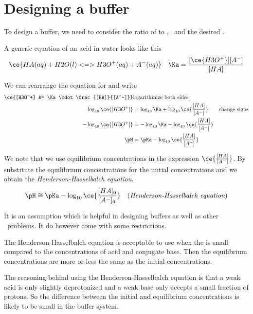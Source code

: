 \documentclass[../mit-general-chemistry.tex]{subfiles}
\begin{document}
\section{Designing a buffer}


To design a buffer, we need to consider the ratio of \ceinl{[HA]} to
\ceinl{[A^-]}, \pKa\ and the desired \pH.

A generic equation of an acid in water looks like this
\begin{align}
  &\ce{HA(aq) + H2O(l) <=> H3O^+(aq) + A^-(aq)}
  &\Ka = \frac{[\ce{H3O^+}][A^-]}{[HA]}
\end{align}

We can rearrange the equation for \Ka and write
\begin{align*}
  \ce{[H3O^+] &= \Ka \cdot\frac{[HA]}{[A^-]}}
  &\text{logarithmize both sides}\\
  \log_{10}\ce{[H3O^+]} &= \log_{10}\Ka +
  \log_{10}\ce{\frac{[HA]}{[A^-]}}
  &\text{change signs}\\
  - \log_{10}\ce{[H3O^+]} &= - \log_{10}\Ka - \log_{10}\ce{\frac{[HA]}{[A^-]}} \\
  \pH &= \pKa - \log_{10}\ce{\frac{[HA]}{[A^-]}} \\
\end{align*}

We note that we use equilibrium concentrations in the expression
$\ce{\frac{[HA]}{[A^-]}}$. By substitute the equilibrium
concentrations for the initial concentrations  and
 we obtain the {\em Henderson-Hasselbalch equation}.
\begin{equation*}
  \pH \cong \pKa - \log_{10}\ce{\frac{[HA]_0}{[A^-]_0}}
  \quad\text{({\em Henderson-Hasselbalch equation})}
\end{equation*}

It is an assumption which is helpful in designing buffers as well as
other \pH\ problems. It do however come with some restrictions.

The Henderson-Hasselbalch equation is acceptable to use when the
\ceinl{[H3O^+]} is small compared to the concentrations of acid and
conjugate base. Then the equilibrium concentrations are more or less
the same as the initial concentrations.

The reasoning behind using the Henderson-Hasselbalch equation is that
a weak acid is only slightly deprotonized and a weak base only accepts
a small fraction of protons. So the difference between the initial and
equilibrium concentrations is likely to be small in the buffer system.
\end{document}
